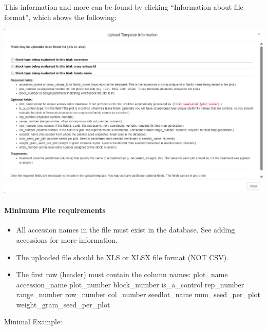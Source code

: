 \documentclass[
  12pt,
]{book}
\begin{document}
This information and more can be found by clicking ``Information about file format'', which shows the following:

\begin{center}\includegraphics[width=0.95\linewidth]{assets/images/manage_trials_upload_trial_template} \end{center}

\hypertarget{minimum-file-requirements}{%
\paragraph*{Minimum File requirements}\label{minimum-file-requirements}}

\begin{itemize}
\item
  All accession names in the file must exist in the database. See adding accessions for more information.
\item
  The uploaded file should be XLS or XLSX file format (NOT CSV).
\item
  The first row (header) must contain the column names: plot\_name accession\_name plot\_number block\_number is\_a\_control rep\_number range\_number row\_number col\_number seedlot\_name num\_seed\_per\_plot weight\_gram\_seed\_per\_plot
\end{itemize}

Minimal Example:
\end{document}
